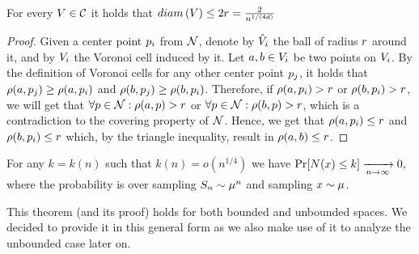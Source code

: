 \documentclass[12pt,a4paper,oneside,onecolumn]{book}
\begin{document}
\begin{lemma}
\label{lem:vordiam}
    For every $V\in \mathcal{C}$ it holds that $diam\left(V\right) \leq 2r = \frac{2}{n^{1/(4d)}}$
\end{lemma}
\begin{proof}
Given a center point $p_i$ from $\mathcal{N}$,
denote by $\hat{V}_i$ the ball of radius $r$ around it, and by $V_i$ the Voronoi cell induced by it.
Let $a,b \in V_i$ be two points on $V_i$.
By the definition of Voronoi cells for any other center point 
$p_j$,
it holds that
$\rho(a,p_j) \geq \rho(a,p_i)$ and $\rho(b,p_j) \geq \rho(b,p_i)$.
Therefore, if 
$\rho(a,p_i) > r$ or $\rho(b,p_i) > r$,
we will get that
$\forall p\in\mathcal{N}: \rho(a,p) > r$ or $\forall p\in\mathcal{N}: \rho(b,p) > r$,
which is a contradiction to the covering property of $\mathcal{N}$.
Hence, we get that
$\rho(a,p_i)\leq r$ and $\rho(b,p_i)\leq r$ which, by the triangle inequality, result in 
$\rho(a,b)\leq r$.
\end{proof}

\begin{lemma}
    \label{lem:doublingcubes}
  For any $k=k(n)$ such that $k(n)=o(n^{1/4})$ we have 
  $\Pr[N(x)\leq k] \xrightarrow[n\to \infty]{} 0,$ 
  where the probability is over sampling $S_n\sim\mu^n$ and sampling $x\sim\mu$.
\end{lemma}

\begin{remark}
This theorem (and its proof) holds for both bounded and unbounded spaces. We decided to provide it in this general form as we also make use of it to analyze the unbounded case later on.
\end{remark}
\end{document}
